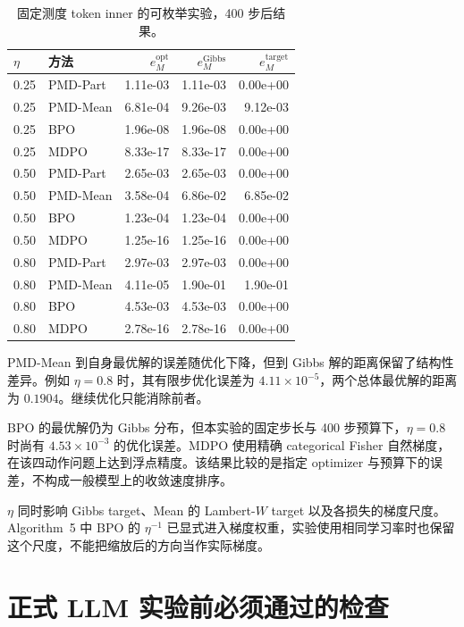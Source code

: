 \begin{table}[ht]
\centering
\caption{固定测度 token inner 的可枚举实验，400 步后结果。}
\label{tab:toy-results}
\begin{tabular}{llrrr}
\toprule
$\eta$ & 方法 & $e^{\mathrm{opt}}_M$ & $e^{\mathrm{Gibbs}}_M$ & $e^{\mathrm{target}}_M$\\
\midrule
0.25 & PMD-Part & 1.11e-03 & 1.11e-03 & 0.00e+00\\
0.25 & PMD-Mean & 6.81e-04 & 9.26e-03 & 9.12e-03\\
0.25 & BPO & 1.96e-08 & 1.96e-08 & 0.00e+00\\
0.25 & MDPO & 8.33e-17 & 8.33e-17 & 0.00e+00\\
0.50 & PMD-Part & 2.65e-03 & 2.65e-03 & 0.00e+00\\
0.50 & PMD-Mean & 3.58e-04 & 6.86e-02 & 6.85e-02\\
0.50 & BPO & 1.23e-04 & 1.23e-04 & 0.00e+00\\
0.50 & MDPO & 1.25e-16 & 1.25e-16 & 0.00e+00\\
0.80 & PMD-Part & 2.97e-03 & 2.97e-03 & 0.00e+00\\
0.80 & PMD-Mean & 4.11e-05 & 1.90e-01 & 1.90e-01\\
0.80 & BPO & 4.53e-03 & 4.53e-03 & 0.00e+00\\
0.80 & MDPO & 2.78e-16 & 2.78e-16 & 0.00e+00\\
\bottomrule
\end{tabular}
\end{table}

PMD-Mean 到自身最优解的误差随优化下降，但到 Gibbs 解的距离保留了结构性差异。例如 $\eta=0.8$ 时，其有限步优化误差为 $4.11\times10^{-5}$，两个总体最优解的距离为 $0.1904$。继续优化只能消除前者。

BPO 的最优解仍为 Gibbs 分布，但本实验的固定步长与 400 步预算下，$\eta=0.8$ 时尚有 $4.53\times10^{-3}$ 的优化误差。MDPO 使用精确 categorical Fisher 自然梯度，在该四动作问题上达到浮点精度。该结果比较的是指定 optimizer 与预算下的误差，不构成一般模型上的收敛速度排序。

$\eta$ 同时影响 Gibbs target、Mean 的 Lambert-$W$ target 以及各损失的梯度尺度。Algorithm~5 中 BPO 的 $\eta^{-1}$ 已显式进入梯度权重，实验使用相同学习率时也保留这个尺度，不能把缩放后的方向当作实际梯度。

\section{正式 LLM 实验前必须通过的检查}


